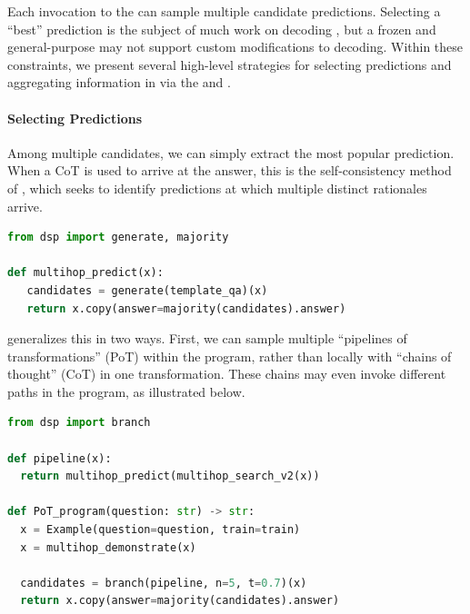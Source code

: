 Each invocation to the \LM{} can sample multiple candidate predictions. Selecting a ``best'' prediction is the subject of much work on decoding \cite{wiher2022decoding,li2022contrastive}, but a frozen and general-purpose \LM{} may not support custom modifications to decoding. Within these constraints, we present several high-level strategies for selecting predictions and aggregating information in \DSP via the \LM{} and \RM{}. 









\paragraph{Selecting Predictions} Among multiple candidates, we can simply extract the most popular prediction. When a CoT is used to arrive at the answer, this is the self-consistency method of \citet{wang2022self}, which seeks to identify predictions at which multiple distinct rationales arrive.

\begin{samepage}
\begin{lstlisting}[language=Python,breaklines=true]
from dsp import generate, majority

def multihop_predict(x):
   candidates = generate(template_qa)(x)
   return x.copy(answer=majority(candidates).answer)
\end{lstlisting}
\end{samepage}

\DSP generalizes this in two ways. First, we can sample multiple ``pipelines of transformations'' (PoT) within the program, rather than locally with ``chains of thought'' (CoT) in one transformation. These chains may even invoke different paths in the program, as illustrated below.

\vspace{8mm}
\begin{samepage}
\begin{lstlisting}[language=Python,breaklines=true]
from dsp import branch

def pipeline(x):
  return multihop_predict(multihop_search_v2(x))

def PoT_program(question: str) -> str:
  x = Example(question=question, train=train)
  x = multihop_demonstrate(x)
  
  candidates = branch(pipeline, n=5, t=0.7)(x)
  return x.copy(answer=majority(candidates).answer)
\end{lstlisting}
\end{samepage}


